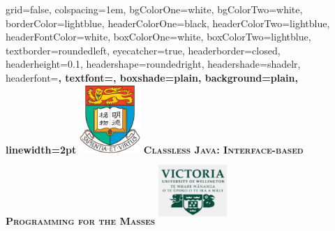 \documentclass[portrait,final,a0paper,fontscale=0.277]{baposter}
\begin{document}
\begin{poster}%
  {
  grid=false,
  colspacing=1em,
  bgColorOne=white,
  bgColorTwo=white,
  borderColor=lightblue,
  headerColorOne=black,
  headerColorTwo=lightblue,
  headerFontColor=white,
  boxColorOne=white,
  boxColorTwo=lightblue,
  textborder=roundedleft,
  eyecatcher=true,
  headerborder=closed,
  headerheight=0.1\textheight,
  headershape=roundedright,
  headershade=shadelr,
  headerfont=\Large\bf\textsc, %
  textfont={\setlength{\parindent}{1.5em}},
  boxshade=plain,
  background=plain,
  linewidth=2pt
  }
  {\includegraphics[height=7em]{pdfs/hku.png}}
  {\bf\textsc{Classless Java: Interface-based Programming for the Masses}\vspace{0.1em}}
  {}
  {%
    \includegraphics[width=7em,height=7em]{pdfs/vuw.png}
  }








    \newcommand{\colouredcircle}{%
      \tikz{\useasboundingbox (-0.2em,-0.32em) rectangle(0.2em,0.32em); \draw[draw=black,fill=lightblue,line width=0.03em] (0,0) circle(0.18em);}}


\end{poster}
\end{document}
